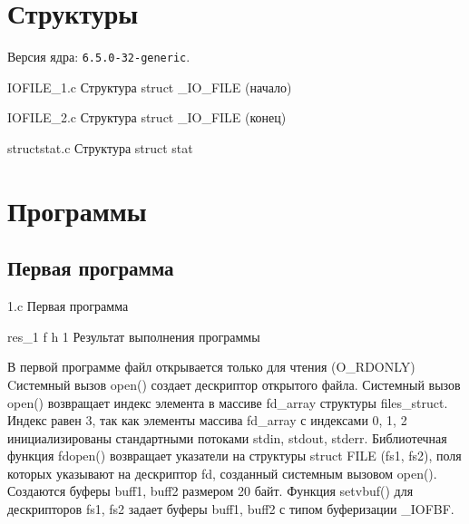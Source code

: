 \chapter{Структуры}

Версия ядра: \texttt{6.5.0-32-generic}.

{IOFILE_1.c} %
{Структура struct \_IO\_FILE (начало)} %

\clearpage 

{IOFILE_2.c} %
{Структура struct \_IO\_FILE (конец)} %

{structstat.c} %
{Структура struct stat} %

\chapter{Программы}

\section{Первая программа}

{1.c} %
{Первая программа} %

{res_1} %
{f} %
{h} %
{1\textwidth} %
{Результат выполнения программы} %


\clearpage 

В первой программе файл открывается только для чтения (O\_RDONLY)
Cистемный вызов open() создает дескриптор открытого файла.
Системный вызов open() возвращает индекс элемента в массиве fd\_array структуры files\_struct.
Индекс равен 3, так как элементы массива fd\_array с индексами 0, 1, 2 инициализированы стандартными потоками stdin, stdout, stderr.
Библиотечная функция fdopen() возвращает указатели на структуры struct FILE (fs1, fs2), поля которых указывают на дескриптор fd, созданный системным вызовом open().
Создаются буферы buff1, buff2 размером 20 байт.
Функция setvbuf() для дескрипторов fs1, fs2 задает буферы buff1, buff2 с типом буферизации \_IOFBF.

